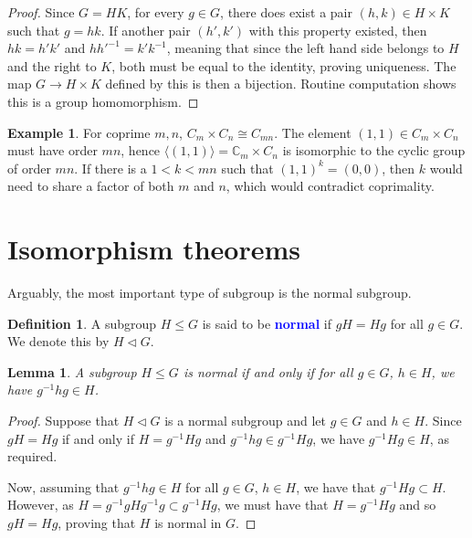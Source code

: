 \documentclass[12pt]{report}
\newcommand{\indx}[1]{\index{#1}\textbf{\textcolor{blue}{#1}}}
\newcommand{\C}{\mathbb{C}}
\newcommand{\iso}{\cong}
\newtheorem{lemma}[theorem]{Lemma}
\theoremstyle{definition}
\newtheorem{definition}[theorem]{Definition}
\newtheorem{example}[theorem]{Example}
\begin{document}
\begin{proof}
  Since \(G = HK\), for every \(g \in G\), there does exist a pair \((h,k) \in H \times K\) such that \(g = hk\). If another pair \((h',k')\) with this property existed, then \(hk = h'k'\) and \(hh'^{-1} = k'k^{-1}\), meaning that since the left hand side belongs to \(H\) and the right to \(K\), both must be equal to the identity, proving uniqueness. The map \(G \to H \times K\) defined by this is then a bijection. Routine computation shows this is a group homomorphism.
\end{proof}

\begin{example}
  For coprime \(m, n\), \(C_{m} \times C_{n} \iso C_{mn}\).
  The element \((1,1) \in C_{m} \times C_{n}\) must have order \(mn\), hence \(\langle (1,1)\rangle= \C_{m} \times C_{n}\) is isomorphic to the cyclic group of order \(mn\).
  If there is a \(1 < k < mn\) such that \((1,1)^{k} = (0,0)\), then \(k\) would need to share a factor of both \(m\) and \(n\), which would contradict coprimality.
\end{example}



\section{Isomorphism theorems}
\label{sec:group-theory:isomorphism-theorems}

Arguably, the most important type of subgroup is the normal subgroup.

\begin{definition}\label{def:group-theory:normal-subgroup}
  A subgroup \(H \leq G\) is said to be \indx{normal} if \(gH = Hg\) for all \(g \in G\).
  We denote this by \(H \triangleleft G\).
\end{definition}

\begin{lemma}\label{lem:group-theory:normal-subgroup-criterion}
  A subgroup \(H \leq G\) is normal if and only if for all \(g \in G\), \(h \in H\), we have \(g^{-1}hg \in H\).
\end{lemma}

\begin{proof}
  Suppose that \(H \triangleleft G\) is a normal subgroup and let \(g \in G\) and \(h \in H\).
  Since \(gH = Hg\) if and only if \(H = g^{-1}Hg\) and \(g^{-1}hg \in  g^{-1}Hg\), we have \(g^{-1}Hg \in H\), as required.

  Now, assuming that \(g^{-1}hg \in H\) for all \(g \in G\), \(h \in H\), we have that \(g^{-1} H g \subset H\). However, as \(H = g^{-1}gHg^{-1}g \subset g^{-1}Hg\), we must have that \(H = g^{-1}Hg\) and so \(gH = Hg\), proving that \(H\) is normal in \(G\).
\end{proof}
\end{document}
